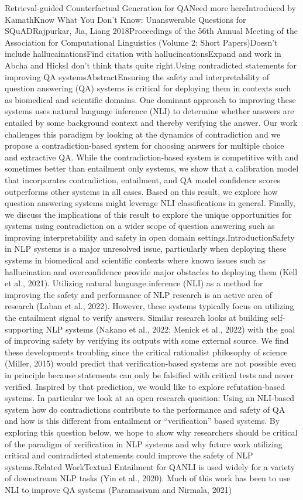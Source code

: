 \documentclass{scrbook}
\begin{document}
Retrieval-guided Counterfactual Generation for QANeed more hereIntroduced by KamathKnow What You Don’t Know: Unanswerable Questions for SQuADRajpurkar, Jia, Liang 2018Proceedings of the 56th Annual Meeting of the Association for Computational Linguistics (Volume 2: Short Papers)Doesn't include hallucainationsFind citation with hallucincationsExpand and work in Abcha and HicksI don't think thats quite right.Using contradicted statements for improving QA systemsAbstractEnsuring the safety and interpretability of question answering (QA) systems is critical for deploying them in contexts such as biomedical and scientific domains. One dominant approach to improving these systems uses natural language inference (NLI) to determine whether answers are entailed by some background context and thereby verifying the answer. Our work challenges this paradigm by looking at the dynamics of contradiction and we propose a contradiction-based system for choosing answers for multiple choice and extractive QA. While the contradiction-based system is competitive with and sometimes better than entailment only systems, we show that a calibration model that incorporates contradiction, entailment, and QA model confidence scores outperforms other systems in all cases. Based on this result, we explore how question answering systems might leverage NLI classifications in general. Finally, we discuss the implications of this result to explore the unique opportunities for systems using contradiction on a wider scope of question answering such as improving interpretability and safety in open domain settings.IntroductionSafety in NLP systems is a major unresolved issue, particularly when deploying these systems in biomedical and scientific contexts where known issues such as hallucination and overconfidence provide major obstacles to deploying them (Kell et al., 2021). Utilizing natural language inference (NLI) as a method for improving the safety and performance of NLP research is an active area of research (Laban et al., 2022). However, these systems typically focus on utilizing the entailment signal to verify answers. Similar research looks at building self-supporting NLP systems (Nakano et al., 2022; Menick et al., 2022) with the goal of improving safety by verifying its outputs with some external source. We find these developments troubling since the critical rationalist philosophy of science (Miller, 2015) would predict that verification-based systems are not possible even in principle because statements can only be falsified with critical tests and never verified. Inspired by that prediction, we would like to explore refutation-based systems. In particular we look at an open research question: Using an NLI-based system how do contradictions contribute to the performance and safety of QA and how is this different from entailment or ``verification'' based systems. By exploring this question below, we hope to show why researchers should be critical of the paradigm of verification in NLP systems and why future work utilizing critical and contradicted statements could improve the safety of NLP systems.Related WorkTextual Entailment for QANLI is used widely for a variety of downstream NLP tasks (Yin et al., 2020). Much of this work has been to use NLI to improve QA systems (Paramasivam and Nirmala, 2021) 
\end{document}
